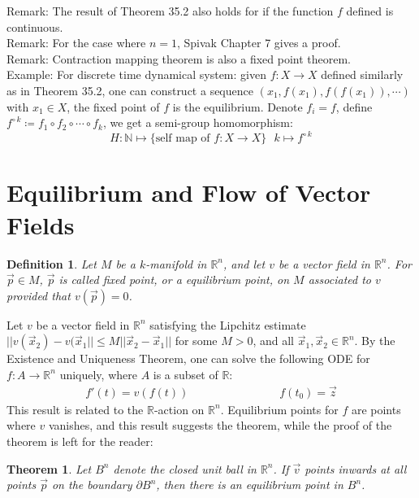 \documentclass[11pt,oneside]{book}
\theoremstyle{break}
\theoremstyle{break}
\newtheorem{thm}{Theorem}[section]
\newtheorem{defn}{Definition}[corL]
\newcommand{\R}{\mathbb{R}}
\newcommand{\N}{\mathbb{N}}
\newcommand{\remark}{\color{blue}Remark: \color{black}}
\newcommand{\example}{\color{green}Example: \color{black}}
\begin{document}
\remark The result of Theorem 35.2 also holds for if the function $f$ defined is continuous.\\
\remark For the case where $n=1$, Spivak Chapter 7 gives a proof.\\
\remark Contraction mapping theorem is also a fixed point theorem.\\

\example For discrete time dynamical system: given $f:X \to X$ defined similarly as in Theorem 35.2, one can construct a sequence $(x_1, f(x_1), f(f(x_1)), \cdots)$ with $x_1 \in X$, the fixed point of $f$ is the equilibrium. Denote $f_i = f$, define $f^{\circ\, k} \coloneqq f_1\circ f_2 \circ\cdots \circ f_k$, we get a semi-group homomorphism: 
$$H:\N \mapsto \{\text{self map of }f: X \to X\} \ \ \ k \mapsto f^{\circ \, k}$$





\newpage
\section[Equilibriums and Flows of Vector Fields]{\color{red}Equilibrium and Flow of Vector Fields\color{black}}
\begin{defn}
Let $M$ be a $k$-manifold in $\R^n$, and let $v$ be a vector field in $\R^n$. For $\vec{p} \in M$, $\vec{p}$ is called fixed point, or a equilibrium point, on $M$ associated to $v$ provided that $v(\vec{p}) = 0$. 
\end{defn}


Let $v$ be a vector field in $\R^n$ satisfying the Lipchitz estimate $||v(\vec{x}_2) - v(\vec{x}_1|| \leq M ||\vec{x}_2 - \vec{x}_1||$ for some $M>0$, and all $\vec{x}_1,\vec{x}_2 \in \R^n$. By the Existence and Uniqueness Theorem, one can solve the following ODE for $f:A \to \R^n$ uniquely, where $A$ is a subset of $\R$:
\begin{align*}
f'(t) = v(f(t)) \qquad\qquad\qquad\qquad f(t_0 ) = \vec{z} 
\end{align*}
This result is related to the $\R$-action on $\R^n$. Equilibrium points for $f$ are points where $v$ vanishes, and this result suggests the theorem, while the proof of the theorem is left for the reader:
\begin{thm}
Let $B^n$ denote the closed unit ball in $\R^n$. If $\vec{v}$ points inwards at all points $\vec{p}$ on the boundary $\partial B^n$, then there is an equilibrium point in $B^n$. 
\end{thm}
\hfill\break
\end{document}
